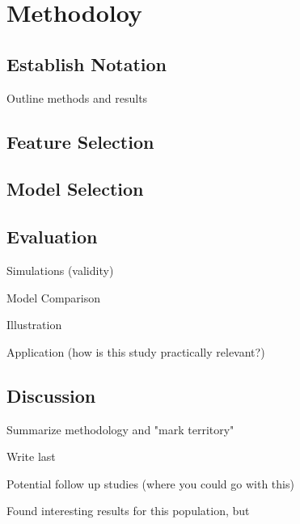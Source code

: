 \chapter{Methodoloy}\label{chap:methodology}


\section{Establish Notation}


Outline methods and results

\section{Feature Selection}


\section{Model Selection}


\section{Evaluation}

Simulations (validity)

Model Comparison

Illustration

Application (how is this study practically relevant?)

\section{Discussion}

Summarize methodology and "mark territory"

Write last

Potential follow up studies (where you could go with this)

Found interesting results for this population, but




